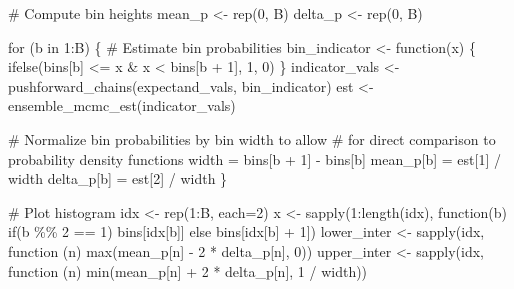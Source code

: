 \documentclass[
  letterpaper,
  DIV=11,
  numbers=noendperiod]{scrartcl}
\newenvironment{Shaded}{\begin{snugshade}}{\end{snugshade}}
\newcommand{\BuiltInTok}[1]{\textcolor[rgb]{0.00,0.23,0.31}{#1}}
\newcommand{\CommentTok}[1]{\textcolor[rgb]{0.37,0.37,0.37}{#1}}
\newcommand{\ControlFlowTok}[1]{\textcolor[rgb]{0.00,0.23,0.31}{#1}}
\newcommand{\DecValTok}[1]{\textcolor[rgb]{0.68,0.00,0.00}{#1}}
\newcommand{\KeywordTok}[1]{\textcolor[rgb]{0.00,0.23,0.31}{#1}}
\newcommand{\NormalTok}[1]{\textcolor[rgb]{0.00,0.23,0.31}{#1}}
\newcommand{\OperatorTok}[1]{\textcolor[rgb]{0.37,0.37,0.37}{#1}}
\begin{document}
\begin{Shaded}
\begin{Highlighting}[]
  
  \CommentTok{\# Compute bin heights}
\NormalTok{  mean\_p }\OperatorTok{\textless{}{-}}\NormalTok{ rep(}\DecValTok{0}\NormalTok{, B)}
\NormalTok{  delta\_p }\OperatorTok{\textless{}{-}}\NormalTok{ rep(}\DecValTok{0}\NormalTok{, B)}
  
  \ControlFlowTok{for}\NormalTok{ (b }\KeywordTok{in} \DecValTok{1}\NormalTok{:B) \{}
    \CommentTok{\# Estimate bin probabilities}
\NormalTok{    bin\_indicator }\OperatorTok{\textless{}{-}}\NormalTok{ function(x) \{}
\NormalTok{      ifelse(bins[b] }\OperatorTok{\textless{}=}\NormalTok{ x }\OperatorTok{\&}\NormalTok{ x }\OperatorTok{\textless{}}\NormalTok{ bins[b }\OperatorTok{+} \DecValTok{1}\NormalTok{], }\DecValTok{1}\NormalTok{, }\DecValTok{0}\NormalTok{)}
\NormalTok{    \}}
\NormalTok{    indicator\_vals }\OperatorTok{\textless{}{-}}\NormalTok{ pushforward\_chains(expectand\_vals, bin\_indicator)}
\NormalTok{    est }\OperatorTok{\textless{}{-}}\NormalTok{ ensemble\_mcmc\_est(indicator\_vals)}
    
    \CommentTok{\# Normalize bin probabilities by bin width to allow}
    \CommentTok{\# for direct comparison to probability density functions}
\NormalTok{    width }\OperatorTok{=}\NormalTok{ bins[b }\OperatorTok{+} \DecValTok{1}\NormalTok{] }\OperatorTok{{-}}\NormalTok{ bins[b]}
\NormalTok{    mean\_p[b] }\OperatorTok{=}\NormalTok{ est[}\DecValTok{1}\NormalTok{] }\OperatorTok{/}\NormalTok{ width}
\NormalTok{    delta\_p[b] }\OperatorTok{=}\NormalTok{ est[}\DecValTok{2}\NormalTok{] }\OperatorTok{/}\NormalTok{ width}
\NormalTok{  \}}
  
  \CommentTok{\# Plot histogram}
\NormalTok{  idx }\OperatorTok{\textless{}{-}}\NormalTok{ rep(}\DecValTok{1}\NormalTok{:B, each}\OperatorTok{=}\DecValTok{2}\NormalTok{)}
\NormalTok{  x }\OperatorTok{\textless{}{-}}\NormalTok{ sapply(}\DecValTok{1}\NormalTok{:length(idx), function(b) }\ControlFlowTok{if}\NormalTok{(b }\OperatorTok{\%\%} \DecValTok{2} \OperatorTok{==} \DecValTok{1}\NormalTok{) bins[idx[b]]}
              \ControlFlowTok{else}\NormalTok{ bins[idx[b] }\OperatorTok{+} \DecValTok{1}\NormalTok{])}
\NormalTok{  lower\_inter }\OperatorTok{\textless{}{-}}\NormalTok{ sapply(idx, function (n)}
    \BuiltInTok{max}\NormalTok{(mean\_p[n] }\OperatorTok{{-}} \DecValTok{2} \OperatorTok{*}\NormalTok{ delta\_p[n], }\DecValTok{0}\NormalTok{))}
\NormalTok{  upper\_inter }\OperatorTok{\textless{}{-}}\NormalTok{ sapply(idx, function (n)}
    \BuiltInTok{min}\NormalTok{(mean\_p[n] }\OperatorTok{+} \DecValTok{2} \OperatorTok{*}\NormalTok{ delta\_p[n], }\DecValTok{1} \OperatorTok{/}\NormalTok{ width))}
  

\end{Highlighting}
\end{Shaded}
\end{document}
